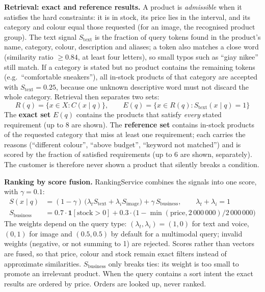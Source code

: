 \textbf{Retrieval: exact and reference results.} A product is \emph{admissible} when it satisfies the hard constraints: it is in stock, its price lies in the interval, and its category and colour equal those requested (for an image, the recognised product group). The text signal $S_\text{text}$ is the fraction of query tokens found in the product's name, category, colour, description and aliases; a token also matches a close word (similarity ratio $\ge 0.84$, at least four letters), so small typos such as ``giay nikee'' still match. If a category is stated but no product contains the remaining tokens (e.g.\ ``comfortable sneakers''), all in-stock products of that category are accepted with $S_\text{text} = 0.25$, because one unknown descriptive word must not discard the whole category. Retrieval then separates two sets:
\begin{equation}
R(q) = \{ x \in X : C(x \mid q) \}, \qquad E(q) = \{ x \in R(q) : S_\text{text}(x \mid q) = 1 \}
\end{equation}
The \textbf{exact set} $E(q)$ contains the products that satisfy \emph{every} stated requirement (up to 8 are shown). The \textbf{reference set} contains in-stock products of the requested category that miss at least one requirement; each carries the reasons (``different colour'', ``above budget'', ``keyword not matched'') and is scored by the fraction of satisfied requirements (up to 6 are shown, separately). The customer is therefore never shown a product that silently breaks a condition.

\textbf{Ranking by score fusion.} RankingService combines the signals into one score, with $\gamma = 0.1$:
\begin{align}
S(x \mid q) &= (1-\gamma)\,\bigl(\lambda_t S_\text{text} + \lambda_i S_\text{image}\bigr) + \gamma\, S_\text{business}, \qquad \lambda_t + \lambda_i = 1 \label{eq:fusion}\\
S_\text{business} &= 0.7 \cdot \mathbf{1}[\text{stock} > 0] + 0.3 \cdot \bigl(1 - \min(\text{price}, 2\,000\,000) / 2\,000\,000\bigr)
\end{align}
The weights depend on the query type: $(\lambda_t, \lambda_i) = (1, 0)$ for text and voice, $(0, 1)$ for image and $(0.5, 0.5)$ by default for a multimodal query; invalid weights (negative, or not summing to 1) are rejected. Scores rather than vectors are fused, so that price, colour and stock remain exact filters instead of approximate similarities. $S_\text{business}$ only breaks ties: its weight is too small to promote an irrelevant product. When the query contains a sort intent the exact results are ordered by price. Orders are looked up, never ranked.

